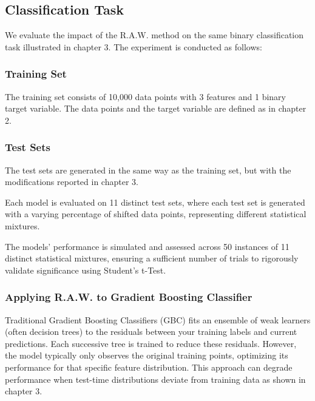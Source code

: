 \subsection{Classification Task}

We evaluate the impact of the R.A.W. method on the same binary classification task illustrated in chapter 3. The experiment is conducted as follows:
\subsubsection{Training Set}
The training set consists of 10,000 data points with 3 features and 1 binary target variable. The data points and the target variable are defined as in chapter 2.



\subsubsection{Test Sets}
The test sets are generated in the same way as the training set, but with the modifications reported in chapter 3.

Each model is evaluated on 11 distinct test sets, where each test set is generated with a varying percentage of shifted data points, representing different statistical mixtures.

The models' performance is simulated and assessed across 50 instances of 11 distinct statistical mixtures, ensuring a sufficient number of trials to rigorously validate significance using Student's t-Test.

\subsubsection{Applying R.A.W. to Gradient Boosting Classifier}

Traditional Gradient Boosting Classifiers (GBC) fits an ensemble of weak learners (often decision trees) to the residuals between your training labels and current predictions. Each successive tree is trained to reduce these residuals. However, the model typically only observes the original training points, optimizing its performance for that specific feature distribution. This approach can degrade performance when test-time distributions deviate from training data as shown in chapter 3. 

